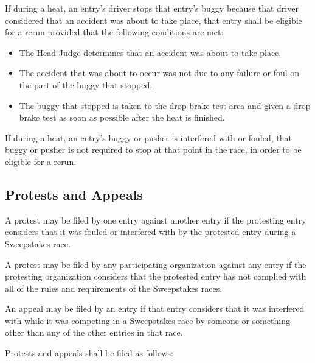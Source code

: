 	If during a heat, an entry's driver stops that entry's buggy because that
	driver considered that an accident was about to take place, that entry shall be
	eligible for a rerun provided that the following conditions are met:

		\begin{itemize}

			\item The Head Judge determines that an accident was about to take
			place.

			\item The accident that was about to occur was not due to any failure
			or foul on the part of the buggy that stopped.

			\item The buggy that stopped is taken to the drop brake test area and
			given a drop brake test as soon as possible after the heat is finished.

		\end{itemize}

	If during a heat, an entry's buggy or pusher is interfered with or fouled, that
	buggy or pusher is not required to stop at that point in the race, in order to
	be eligible for a rerun.

\subsection{Protests and Appeals}

	A protest may be filed by one entry against another entry if the protesting
	entry considers that it was fouled or interfered with by the protested entry
	during a Sweepstakes race.

	A protest may be filed by any participating organization against any entry if
	the protesting organization considers that the protested entry has not complied
	with all of the rules and requirements of the Sweepstakes races.

	An appeal may be filed by an entry if that entry considers that it was
	interfered with while it was competing in a Sweepstakes race by someone or
	something other than any of the other entries in that race.

	Protests and appeals shall be filed as follows:

